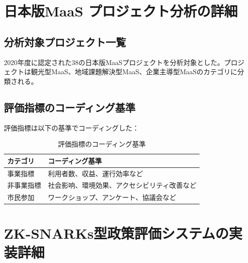 \section{日本版MaaS プロジェクト分析の詳細}
\label{app:maas_analysis}

\subsection{分析対象プロジェクト一覧}

2020年度に認定された38の日本版MaaSプロジェクトを分析対象とした。プロジェクトは観光型MaaS、地域課題解決型MaaS、企業主導型MaaSのカテゴリに分類される。

\subsection{評価指標のコーディング基準}

評価指標は以下の基準でコーディングした：

\begin{table}[htbp]
\centering
\caption{評価指標のコーディング基準}
\begin{tabular}{ll}
\toprule
カテゴリ & コーディング基準 \\
\midrule
事業指標 & 利用者数、収益、運行効率など \\
非事業指標 & 社会影响、環境効果、アクセシビリティ改善など \\
市民参加 & ワークショップ、アンケート、協議会など \\
\bottomrule
\end{tabular}
\end{table}

\section{ZK-SNARKs型政策評価システムの実装詳細}
\label{app:zk_implementation}

